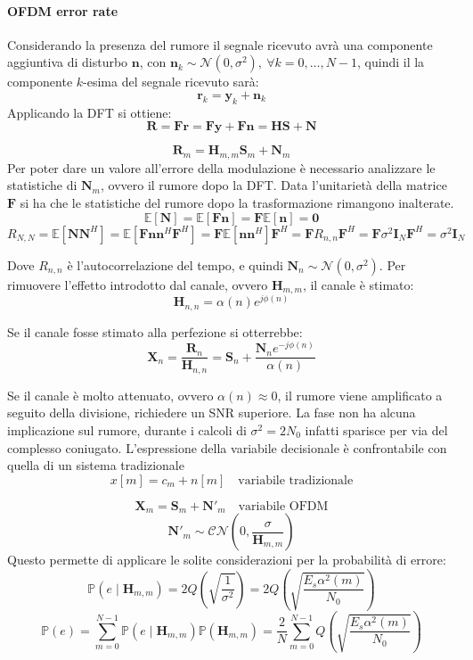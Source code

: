 \paragraph*{OFDM error rate}
Considerando la presenza del rumore il segnale ricevuto avrà una componente aggiuntiva di disturbo $\mathbf{n}$, con $\mathbf{n}_k \sim \mathcal{N}(0, \sigma^2), \ \forall k = 0, \ldots, N-1$, quindi il la componente $k$-esima del segnale ricevuto sarà:
\[
    \mathbf{r}_k = \mathbf{y}_k + \mathbf{n}_k
\]
Applicando la DFT si ottiene:
\[
    \mathbf{R} = \mathbf{F}\mathbf{r} = \mathbf{F}\mathbf{y} + \mathbf{F}\mathbf{n} = \mathbf{H}\mathbf{S} + \mathbf{N}
\]

\[
    \mathbf{R}_{m} = \mathbf{H}_{m, m}\mathbf{S}_{m} + \mathbf{N}_{m}
\]
Per poter dare un valore all'errore della modulazione è necessario analizzare le statistiche di $\mathbf{N}_{m}$, ovvero il rumore dopo la DFT.
Data l'unitarietà della matrice $\mathbf{F}$ si ha che le statistiche del rumore dopo la trasformazione rimangono inalterate.
\[
    \mathbb{E}[\mathbf{N}] = \mathbb{E}[\mathbf{F}\mathbf{n}] = \mathbf{F} \mathbb{E}[\mathbf{n}] = \mathbf{0}
\]  
\[
    R_{N,N} = \mathbb{E}[\mathbf{N}\mathbf{N}^H] = \mathbb{E}[\mathbf{F}\mathbf{n}\mathbf{n}^H\mathbf{F}^H] = \mathbf{F}\mathbb{E}[\mathbf{n}\mathbf{n}^H]\mathbf{F}^H = \mathbf{F}R_{n,n}\mathbf{F}^H = \mathbf{F} \sigma^2 \mathbf{I}_N \mathbf{F}^H = \sigma^2 \mathbf{I}_N
\]

Dove $R_{n,n}$ è l'autocorrelazione del tempo, e quindi $\mathbf{N}_{n} \sim \mathcal{N}(0, \sigma^2)$.
Per rimuovere l'effetto introdotto dal canale, ovvero $\mathbf{H}_{m,m}$, il canale è stimato:
\[
    \mathbf{H}_{n, n}= \alpha(n) e^{j\phi(n)}
\]

Se il canale fosse stimato alla perfezione si otterrebbe:
\[
    \mathbf{X}_{n} = \frac{\mathbf{R}_{n}}{\mathbf{H}_{n, n}} = \mathbf{S}_{n} + \frac{\mathbf{N}_{n} e^{-j\phi(n)}}{\alpha(n)}
\]


Se il canale è molto attenuato, ovvero $\alpha(n) \approx 0$, il rumore viene amplificato a seguito della divisione, richiedere un SNR superiore.
La fase non ha alcuna implicazione sul rumore, durante i calcoli di $\sigma ^2=2N_0$ infatti sparisce per via del complesso coniugato.
L'espressione della variabile decisionale è confrontabile con quella di un sistema tradizionale
\[
    x[m] = c_m + n[m] \quad \text{variabile tradizionale}
\]

\[
    \mathbf{X}_{m} = \mathbf{S}_{m} + \mathbf{N}'_{m} \quad \text{variabile OFDM}
\]
\[
    \mathbf{N}'_{m} \sim \mathcal{CN}(0, \frac{\sigma}{\mathbf{H}_{m, m}})
\]
Questo permette di applicare le solite considerazioni per la probabilità di errore:
\[
    \mathbb{P}(e \mid \mathbf{H}_{m, m}) = 2 Q\left( \sqrt{\frac{1}{\sigma^2}}  \right) = 2 Q\left( \sqrt{\frac{E_s \alpha^2(m)}{N_0}}  \right) 
\]
\[
    \mathbb{P}(e) = \sum_{m=0}^{N-1} \mathbb{P}(e \mid \mathbf{H}_{m, m}) \mathbb{P}(\mathbf{H}_{m,m}) = \frac{2}{N} \sum_{m=0}^{N-1} Q\left( \sqrt{\frac{E_s \alpha^2(m)}{N_0}}  \right)
\]

